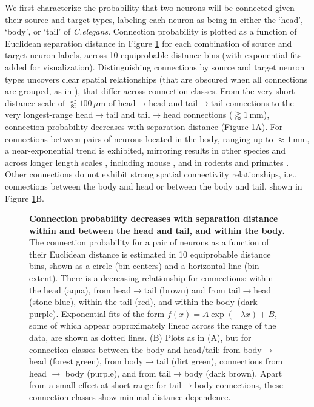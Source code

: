 We first characterize the probability that two neurons will be connected given their source and target types, labeling each neuron as being in either the `head', `body', or `tail' of \emph{C.elegans}.
Connection probability is plotted as a function of Euclidean separation distance in Figure \ref{fig:Ch2Fig3} for each combination of source and target neuron labels, across 10 equiprobable distance bins (with exponential fits added for visualization).
Distinguishing connections by source and target neuron types uncovers clear spatial relationships (that are obscured when all connections are grouped, as in \citep{Azulay2016}), that differ across connection classes.
From the very short distance scale of $\lessapprox 100\,\mu$m of head$\rightarrow$head and tail$\rightarrow$tail connections to the very longest-range head$\rightarrow$tail and tail$\rightarrow$head connections ($\gtrapprox 1\,$mm), connection probability decreases with separation distance (Figure \ref{fig:Ch2Fig3}A).
For connections between pairs of neurons located in the body, ranging up to $\approx 1$\,mm, a near-exponential trend is exhibited, mirroring results in other species and across longer length scales \citep{Wang2016}, including mouse \citep{Goulas2017, Fulcher2016}, and in rodents and primates \citep{Horvat2016}.
Other connections do not exhibit strong spatial connectivity relationships, i.e., connections between the body and head or between the body and tail, shown in Figure \ref{fig:Ch2Fig3}B.

\begin{figure}[h]
  \caption{
\textbf{Connection probability decreases with separation distance within and between the head and tail, and within the body.}
The connection probability for a pair of neurons as a function of their Euclidean distance is estimated in 10 equiprobable distance bins, shown as a circle (bin centers) and a horizontal line (bin extent).
There is a decreasing relationship for connections: within the head (aqua), from head$\rightarrow$tail (brown) and from tail$\rightarrow$head (stone blue), within the tail (red), and within the body (dark purple).
Exponential fits of the form $f(x) = A\exp(-\lambda x) + B$, some of which appear approximately linear across the range of the data, are shown as dotted lines.
(B)
Plots as in (A), but for connection classes between the body and head/tail: from body$\rightarrow$head (forest green), from body$\rightarrow$tail (dirt green), connections from head $\rightarrow$ body (purple), and from tail$\rightarrow$body (dark brown).
Apart from a small effect at short range for tail$\rightarrow$body connections, these connection classes show minimal distance dependence.}
\label{fig:Ch2Fig3}
\end{figure}

